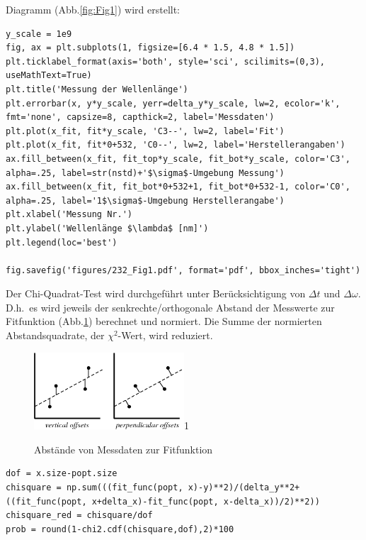 \documentclass[a4paper,10pt]{article}
\begin{document}
Diagramm (Abb.\ref{fig:Fig1}) wird erstellt:\begin{lstlisting}
y_scale = 1e9
fig, ax = plt.subplots(1, figsize=[6.4 * 1.5, 4.8 * 1.5])
plt.ticklabel_format(axis='both', style='sci', scilimits=(0,3), useMathText=True)
plt.title('Messung der Wellenlänge')
plt.errorbar(x, y*y_scale, yerr=delta_y*y_scale, lw=2, ecolor='k', fmt='none', capsize=8, capthick=2, label='Messdaten')
plt.plot(x_fit, fit*y_scale, 'C3--', lw=2, label='Fit')
plt.plot(x_fit, fit*0+532, 'C0--', lw=2, label='Herstellerangaben')
ax.fill_between(x_fit, fit_top*y_scale, fit_bot*y_scale, color='C3', alpha=.25, label=str(nstd)+'$\sigma$-Umgebung Messung')
ax.fill_between(x_fit, fit_bot*0+532+1, fit_bot*0+532-1, color='C0', alpha=.25, label='1$\sigma$-Umgebung Herstellerangabe')
plt.xlabel('Messung Nr.')
plt.ylabel('Wellenlänge $\lambda$ [nm]')
plt.legend(loc='best')

fig.savefig('figures/232_Fig1.pdf', format='pdf', bbox_inches='tight')

\end{lstlisting}

Der Chi-Quadrat-Test wird durchgeführt unter Berücksichtigung von \( \Delta t\) und \(\Delta \omega\). D.h.~es wird jeweils der senkrechte/orthogonale Abstand der Messwerte zur Fitfunktion (Abb.\ref{fig:chi}) berechnet und normiert\fnrefa.
 Die Summe der normierten Abstandsquadrate, der \unboldmath\( \chi^{2}\)-Wert, wird  reduziert.\boldmath

\begin{figure}[htb]
  \centering
  \begin{annotate}{\includegraphics[width=0.5\textwidth]{chi.png}}{1}
  \end{annotate}
\caption[Abstände von Messdaten zur Fitfunktion]{Abstände von Messdaten zur Fitfunktion\footnotemark}
\label{fig:chi}
\end{figure}

\begin{lstlisting}
dof = x.size-popt.size
chisquare = np.sum(((fit_func(popt, x)-y)**2)/(delta_y**2+((fit_func(popt, x+delta_x)-fit_func(popt, x-delta_x))/2)**2))
chisquare_red = chisquare/dof
prob = round(1-chi2.cdf(chisquare,dof),2)*100

\end{lstlisting}
\end{document}
